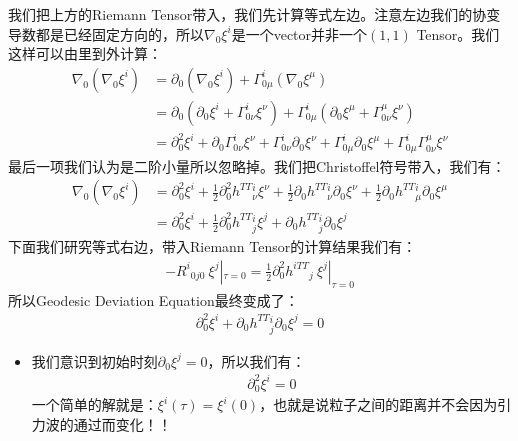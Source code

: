 \bigskip
{}

我们把上方的Riemann Tensor带入，我们先计算等式左边。注意左边我们的协变导数都是已经固定方向的，所以$ \nabla_0 \xi^i $是一个vector并非一个$ (1,1) $ Tensor。我们这样可以由里到外计算：
\begin{align}
  \nabla_{0}(\nabla_{0}\xi^{i}) &= \partial_{0}(\nabla_{0}\xi^{i}) + \Gamma_{0\mu}^{i}(\nabla_{0}\xi^{\mu}) \\
  &= \partial_{0}\left(\partial_{0}\xi^{i} + \Gamma_{0\nu}^{i}\xi^{\nu}\right) + \Gamma_{0\mu}^{i}\left(\partial_{0}\xi^{\mu} + \Gamma_{0\nu}^{\mu}\xi^{\nu}\right) \\
  &= \partial_{0}^{2}\xi^{i} + \partial_{0}\Gamma_{0\nu}^{i}\xi^{\nu} + \Gamma_{0\nu}^{i}\partial_{0}\xi^{\nu} + \Gamma_{0\mu}^{i}\partial_{0}\xi^{\mu} + \Gamma_{0\mu}^{i}\Gamma_{0\nu}^{\mu}\xi^{\nu}
\end{align}
最后一项我们认为是二阶小量所以忽略掉。我们把Christoffel符号带入，我们有：
\begin{align}
  \nabla_{0}(\nabla_{0}\xi^{i}) &= \partial_{0}^{2}\xi^{i} + \frac{1}{2}\partial_{0}^{2}h^{TT}{}^{i}_\nu \xi^{\nu} + \frac{1}{2}\partial_{0}h^{TT}{}^{i}_\nu \partial_{0}\xi^{\nu} + \frac{1}{2}\partial_{0}h^{TT}{}^{i}_\mu \partial_{0}\xi^{\mu} \\
  &= \partial_{0}^{2}\xi^{i} + \frac{1}{2}\partial_{0}^{2}h^{TT}{}^{i}_j \xi^{j} + \partial_{0}h^{TT}{}^{i}_j \partial_{0}\xi^{j}
\end{align}
下面我们研究等式右边，带入Riemann Tensor的计算结果我们有：
\begin{align}
  -R^{i}{}_{0j0} \ \xi^{j}|_{\tau=0} = \frac{1}{2}\partial_{0}^{2}h^{iTT}{}_{j} \ \xi^{j}|_{\tau=0}
\end{align}
所以Geodesic Deviation Equation最终变成了：
\begin{align}
  \partial_{0}^{2}\xi^{i} + \partial_{0}h^{TT}{}^{i}_j \partial_{0}\xi^{j} = 0
\end{align}
\begin{itemize}
  \item 我们意识到初始时刻$ \partial_{0}\xi^{j} = 0 $，所以我们有：
    \begin{align}
      \partial_{0}^{2}\xi^{i} = 0
    \end{align}
    一个简单的解就是：$  \xi^{i}(\tau) = \xi^{i}(0) $，也就是说粒子之间的距离并不会因为引力波的通过而变化！！
\end{itemize}

